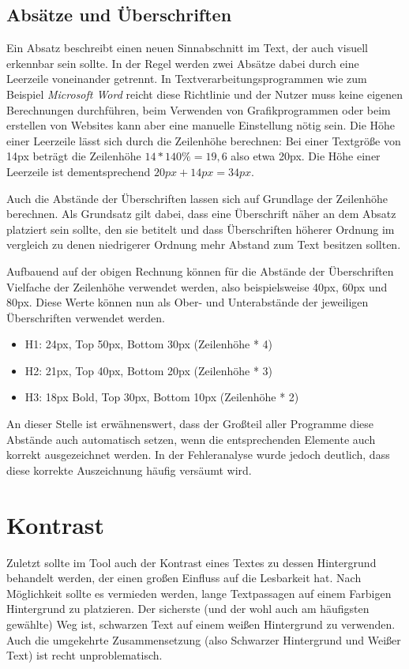 \subsection{Absätze und Überschriften}
Ein Absatz beschreibt einen neuen Sinnabschnitt im Text, der auch visuell erkennbar sein sollte. In der Regel werden zwei Absätze dabei durch eine Leerzeile voneinander getrennt. In Textverarbeitungsprogrammen wie zum Beispiel \textit{Microsoft Word} reicht diese Richtlinie und der Nutzer muss keine eigenen Berechnungen durchführen, beim Verwenden von Grafikprogrammen oder beim erstellen von Websites kann aber eine manuelle Einstellung nötig sein. Die Höhe einer Leerzeile lässt sich durch die Zeilenhöhe berechnen: Bei einer Textgröße von 14px beträgt die Zeilenhöhe \(14 * 140\% = 19,6\) also etwa 20px. Die Höhe einer Leerzeile ist dementsprechend \(20px + 14px = 34px\).

Auch die Abstände der Überschriften lassen sich auf Grundlage der Zeilenhöhe berechnen. Als Grundsatz gilt dabei, dass eine Überschrift näher an dem Absatz platziert sein sollte, den sie betitelt und dass Überschriften höherer Ordnung im vergleich zu denen niedrigerer Ordnung mehr Abstand zum Text besitzen sollten.

Aufbauend auf der obigen Rechnung können für die Abstände der Überschriften Vielfache der Zeilenhöhe verwendet werden, also beispielsweise 40px, 60px und 80px. Diese Werte können nun als Ober- und Unterabstände der jeweiligen Überschriften verwendet werden.

\begin{itemize}
	\item H1: 24px, Top 50px, Bottom 30px (Zeilenhöhe * 4)
	\item H2: 21px, Top 40px, Bottom 20px (Zeilenhöhe * 3)
	\item H3: 18px Bold, Top 30px, Bottom 10px (Zeilenhöhe * 2)
\end{itemize}

An dieser Stelle ist erwähnenswert, dass der Großteil aller Programme diese Abstände auch automatisch setzen, wenn die entsprechenden Elemente auch korrekt ausgezeichnet werden. In der Fehleranalyse wurde jedoch deutlich, dass diese korrekte Auszeichnung häufig versäumt wird.


\section{Kontrast}
Zuletzt sollte im Tool auch der Kontrast eines Textes zu dessen Hintergrund behandelt werden, der einen großen Einfluss auf die Lesbarkeit hat.
Nach Möglichkeit sollte es vermieden werden, lange Textpassagen auf einem Farbigen Hintergrund zu platzieren.
Der sicherste (und der wohl auch am häufigsten gewählte) Weg ist, schwarzen Text auf einem weißen Hintergrund zu verwenden. Auch die umgekehrte Zusammensetzung (also Schwarzer Hintergrund und Weißer Text) ist recht unproblematisch.

